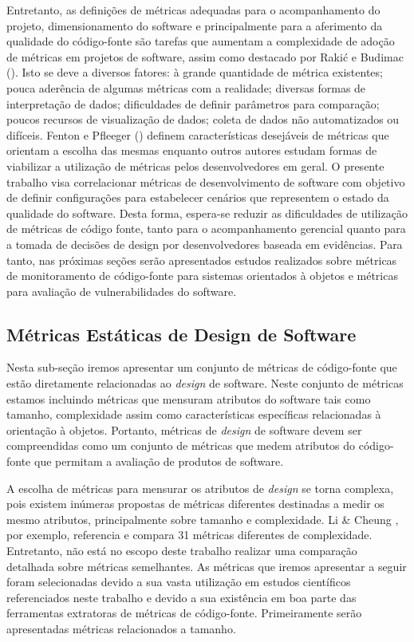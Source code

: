 Entretanto, as definições de métricas adequadas para o acompanhamento do projeto, dimensionamento do software e principalmente para a aferimento da qualidade do código-fonte são tarefas que aumentam a complexidade de adoção de métricas em projetos de software, assim como destacado por Rakić e Budimac (\citeyear{rakic2011budimac}). Isto se deve a diversos fatores: à grande quantidade de métrica existentes; pouca aderência de algumas métricas com a realidade; diversas formas de interpretação de dados; dificuldades de definir parâmetros para comparação; poucos recursos de visualização de dados; coleta de dados não automatizados ou difíceis. Fenton e Pfleeger (\citeyear{fenton1998}) definem características desejáveis de métricas que orientam a escolha das mesmas enquanto outros autores \cite{meirelles2013metrics}\cite{almeida2010} estudam formas de viabilizar a utilização de métricas pelos desenvolvedores em geral. O presente trabalho visa correlacionar métricas de desenvolvimento de software com objetivo de definir configurações para estabelecer cenários que representem o estado da qualidade do software. Desta forma, espera-se reduzir as dificuldades de utilização de métricas de código fonte, tanto para o acompanhamento gerencial quanto para a tomada de decisões de design por desenvolvedores baseada em evidências. Para tanto, nas próximas seções serão apresentados estudos realizados sobre métricas de monitoramento de código-fonte para sistemas orientados à objetos e métricas para avaliação de vulnerabilidades do software.

%

\subsection{Métricas Estáticas de Design de Software}

Nesta sub-seção iremos apresentar um conjunto de métricas de código-fonte que estão diretamente relacionadas ao \emph{design} de software. Neste conjunto de métricas estamos incluindo métricas que mensuram atributos do software tais como tamanho, complexidade assim como características específicas relacionadas à orientação à objetos. Portanto, métricas de \emph{design} de software devem ser compreendidas como um conjunto de métricas que medem atributos do código-fonte que permitam a avaliação de produtos de software.

%

A escolha de métricas para mensurar os atributos de \emph{design} se torna complexa, pois existem inúmeras propostas de métricas diferentes destinadas a medir os mesmo atributos, principalmente sobre tamanho e complexidade. Li \& Cheung \citeyear{li1987}, por exemplo, referencia e compara 31 métricas diferentes de complexidade. Entretanto, não está no escopo deste trabalho realizar uma comparação detalhada sobre métricas semelhantes. As métricas que iremos apresentar a seguir foram selecionadas devido a sua vasta utilização em estudos científicos referenciados neste trabalho e devido a sua existência em boa parte das ferramentas extratoras de métricas de código-fonte. Primeiramente serão apresentadas métricas relacionados a tamanho.

